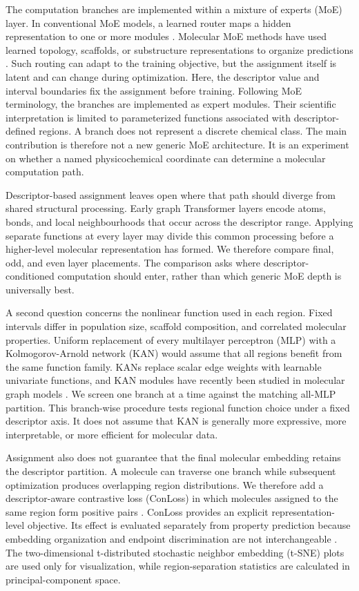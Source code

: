 \documentclass[journal=jcisd8,manuscript=article]{achemso}
\begin{document}
The computation branches are implemented within a mixture of experts (MoE)
layer. In conventional MoE models, a learned router maps a hidden representation
to one or more modules \cite{Jacobs1991,Shazeer2017,Fedus2022}. Molecular MoE
methods have used learned topology, scaffolds, or substructure representations
to organize predictions \cite{Kim2023,Jiang2025ESIBMol}. Such routing can adapt
to the training objective, but the assignment itself is latent and can change
during optimization. Here, the descriptor value and interval boundaries fix
the assignment before training. Following MoE terminology, the branches are
implemented as expert modules. Their scientific interpretation is limited to
parameterized functions associated with descriptor-defined regions. A branch
does not represent a discrete chemical class. The main contribution is
therefore not a new generic MoE architecture. It is an experiment on whether a
named physicochemical coordinate can determine a molecular computation path.

Descriptor-based assignment leaves open where that path should diverge from
shared structural processing. Early graph Transformer layers encode atoms,
bonds, and local neighbourhoods that occur across the descriptor range. Applying
separate functions at every layer may divide this common processing before a
higher-level molecular representation has formed. We therefore compare final,
odd, and even layer placements. The comparison asks where descriptor-conditioned
computation should enter, rather than which generic MoE depth is universally
best.

A second question concerns the nonlinear function used in each region. Fixed
intervals differ in population size, scaffold composition, and correlated
molecular properties. Uniform replacement of every multilayer perceptron (MLP)
with a Kolmogorov-Arnold network (KAN) would assume that all regions benefit from
the same function family. KANs replace scalar edge weights with learnable
univariate functions, and KAN modules have recently been studied in molecular
graph models \cite{Liu2025,Li2025}. We screen one branch at a time against the
matching all-MLP partition. This branch-wise procedure tests regional function
choice under a fixed descriptor axis. It does not assume that KAN is generally
more expressive, more interpretable, or more efficient for molecular data.

Assignment also does not guarantee that the final molecular embedding retains
the descriptor partition. A molecule can traverse one branch while subsequent
optimization produces overlapping region distributions. We therefore add a
descriptor-aware contrastive loss (ConLoss) in which molecules assigned to the
same region form positive pairs \cite{Khosla2020}. ConLoss provides an explicit
representation-level objective. Its effect is evaluated separately from
property prediction because embedding organization and endpoint discrimination
are not interchangeable \cite{Zhang2024RepresentationAudit,Welsch2026}. The
two-dimensional t-distributed stochastic neighbor embedding (t-SNE) plots are
used only for visualization, while region-separation statistics are calculated
in principal-component space.
\end{document}
